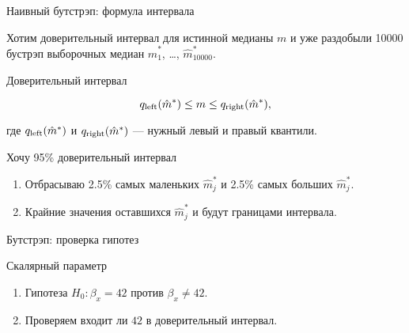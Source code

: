 \begin{frame}{Наивный бутстрэп: формула интервала}

Хотим доверительный интервал для истинной медианы $m$ и уже раздобыли 10000 бустрэп выборочных медиан $\hat m^*_1$, \ldots, $\hat m^*_{10000}$.

\pause
\begin{block}{Доверительный интервал}

  \[
  q_{\text{left}}(\hat m^*) \leq m \leq q_{\text{right}}(\hat m^*),  
  \]

  где $q_{\text{left}}(\hat m^*)$ и $q_{\text{right}}(\hat m^*)$ — нужный левый и правый квантили. 
\end{block}

\pause
\begin{block}{Хочу 95\% доверительный интервал}

\begin{enumerate}[<+->]
  \item Отбрасываю 2.5\% самых маленьких $\hat m^*_j$ и 
  2.5\% самых больших $\hat m^*_j$.
  \item Крайние значения оставшихся $\hat m^*_j$ и будут границами интервала. 
\end{enumerate}
\end{block}

\end{frame}

\begin{frame}{Бутстрэп: проверка гипотез}

\pause
\alert{Скалярный параметр}
\begin{enumerate}[<+->]
  \item Гипотеза $H_0: \beta_x = 42$ против $\beta_x \neq 42$.
  \item Проверяем входит ли $42$ в доверительный интервал. 
\end{enumerate}


\end{frame}
  

